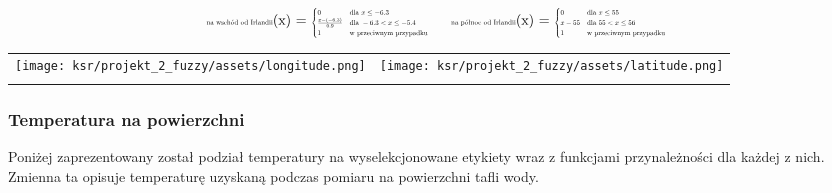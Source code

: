 \documentclass{article}
\begin{document}
\begin{equation*}
\begin{minipage}{0.5\textwidth}
\centering
\text{\scalebox{0.5}{na wschód od Irlandii}}(x) = \scalebox{0.5}{$
\begin{cases} 
0 & \text{dla } x \leq -6.3 \\
\frac{x - (-6.3)}{0.9} & \text{dla } -6.3 < x \leq -5.4 \\
1 & \text{w przeciwnym przypadku}
\end{cases}
$}
\end{minipage}%
\begin{minipage}{0.5\textwidth}
\centering
\text{\scalebox{0.5}{na północ od Irlandii}}(x) = \scalebox{0.5}{$
\begin{cases} 
0 & \text{dla } x \leq 55 \\
x - 55 & \text{dla } 55 < x \leq 56 \\
1 & \text{w przeciwnym przypadku}
\end{cases}
$}
\end{minipage}
\end{equation*}




\begin{table}[H]
\centering
\begin{tabular}{cc}
    \texttt{[image: ksr/projekt\_2\_fuzzy/assets/longitude.png]} &
    \texttt{[image: ksr/projekt\_2\_fuzzy/assets/latitude.png]} \\
     \\
\end{tabular}
\label{fig:two_images}
\end{table}

\subsubsection{Temperatura na powierzchni}

\noindent Poniżej zaprezentowany został podział temperatury na wyselekcjonowane etykiety wraz z funkcjami przynależności dla każdej z nich. Zmienna ta opisuje temperaturę uzyskaną podczas pomiaru na powierzchni tafli wody.
\end{document}
